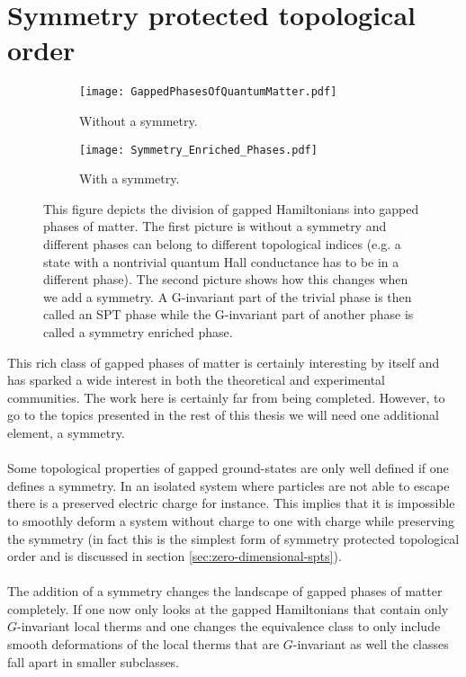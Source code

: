 \section{Symmetry protected topological order}
\begin{figure}
	\begin{subfigure}[b]{0.45\textwidth}
		\centering
		\texttt{[image: GappedPhasesOfQuantumMatter.pdf]}
		\caption{Without a symmetry.}
	\end{subfigure}
	\hfil
	\begin{subfigure}[b]{0.45\textwidth}
		\centering
		\texttt{[image: Symmetry\_Enriched\_Phases.pdf]}
		\caption{With a symmetry.}
	\end{subfigure}
	\caption{This figure depicts the division of gapped Hamiltonians into gapped phases of matter. The first picture is without a symmetry and different phases can belong to different topological indices (e.g. a state with a nontrivial quantum Hall conductance has to be in a different phase). The second picture shows how this changes when we add a symmetry. A G-invariant part of the trivial phase is then called an SPT phase while the G-invariant part of another phase is called a symmetry enriched phase.}
	\label{fig:SymmetryEnrichedIntroduction}
\end{figure}
This rich class of gapped phases of matter is certainly interesting by itself and has sparked a wide interest in both the theoretical and experimental communities. The work here is certainly far from being completed. However, to go to the topics presented in the rest of this thesis we will need one additional element, a symmetry.
\\\\
Some topological properties of gapped ground-states are only well defined if one defines a symmetry. In an isolated system where particles are not able to escape there is a preserved electric charge for instance. This implies that it is impossible to smoothly deform a system without charge to one with charge while preserving the symmetry (in fact this is the simplest form of symmetry protected topological order and is discussed in section \ref{sec:zero-dimensional-spts}).
\\\\
The addition of a symmetry changes the landscape of gapped phases of matter completely. If one now only looks at the gapped Hamiltonians that contain only $G$-invariant local therms and one changes the equivalence class to only include smooth deformations of the local therms that are $G$-invariant as well the classes fall apart in smaller subclasses.
